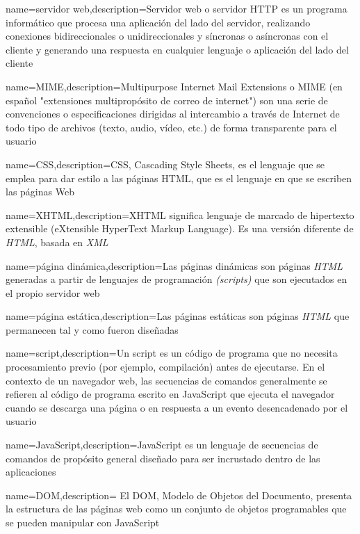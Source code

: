 {name={servidor web},description={Servidor web o servidor HTTP es un programa informático que procesa una aplicación del lado del servidor, realizando conexiones bidireccionales o unidireccionales y síncronas o asíncronas con el cliente y generando una respuesta en cualquier lenguaje o aplicación del lado del cliente}}

{name={MIME},description={Multipurpose Internet Mail Extensions o MIME (en español "extensiones multipropósito de correo de internet") son una serie de convenciones o especificaciones dirigidas al intercambio a través de Internet de todo tipo de archivos (texto, audio, vídeo, etc.) de forma transparente para el usuario}}

{name={CSS},description={CSS, Cascading Style Sheets, es el lenguaje que se emplea para dar estilo a las páginas HTML, que es el lenguaje en que se escriben las páginas Web}}

{name={XHTML},description={XHTML significa lenguaje de marcado de hipertexto extensible (eXtensible HyperText Markup Language). Es una versión diferente de \textit{HTML}, basada en \textit{XML}}}

{name={p\'agina din\'amica},description={Las páginas dinámicas  son páginas \textit{HTML} generadas a partir de lenguajes de programación \textit{(scripts)} que son ejecutados en el propio servidor web}}

{name={p\'agina est\'atica},description={Las páginas estáticas son páginas \textit{HTML} que permanecen tal y como fueron diseñadas}}

{name={script},description={Un script es un código de programa que no necesita procesamiento previo (por ejemplo, compilación) antes de ejecutarse. En el contexto de un navegador web, las secuencias de comandos generalmente se refieren al código de programa escrito en JavaScript que ejecuta el navegador cuando se descarga una página o en respuesta a un evento desencadenado por el usuario}}

{name={JavaScript},description={JavaScript es un lenguaje de secuencias de comandos de propósito general diseñado para ser incrustado dentro de las aplicaciones}}

{name={DOM},description= {El DOM, Modelo de Objetos del Documento,  presenta la estructura de las páginas web como un conjunto de objetos programables que se pueden manipular con JavaScript}}

